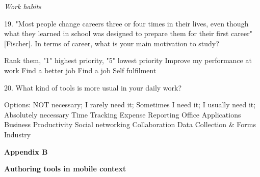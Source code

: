 \begin{small}
\textit{Work habits}

19. "Most people change careers three or four times in their lives, even though what they learned in school was designed to prepare them for their first career" [Fischer]. In terms of career, what is your main motivation to study? 

Rank them, "1" highest priority, "5" lowest priority
\hfill \break {}  Improve my performance at work
\hfill \break {}  Find a better job
\hfill \break {}  Find a job
\hfill \break {}  Self fulfilment


20. What kind of tools is more usual in your daily work? 

Options: NOT necessary; I rarely need it; Sometimes I need it; I usually need it; Absolutely necessary
\hfill \break {}  Time Tracking					
\hfill \break {}  Expense Reporting					
\hfill \break {}  Office Applications					
\hfill \break {}  Business					
\hfill \break {}  Productivity					
\hfill \break {}  Social networking					
\hfill \break {}  Collaboration					
\hfill \break {}  Data Collection \& Forms					
\hfill \break {}  Industry					



\end{small}



\clearpage{\pagestyle{empty}\cleardoublepage}

\begin{Large}
\textbf{Appendix B} 
\end{Large}
\vspace{3em}

\textbf{Authoring tools in mobile context}

